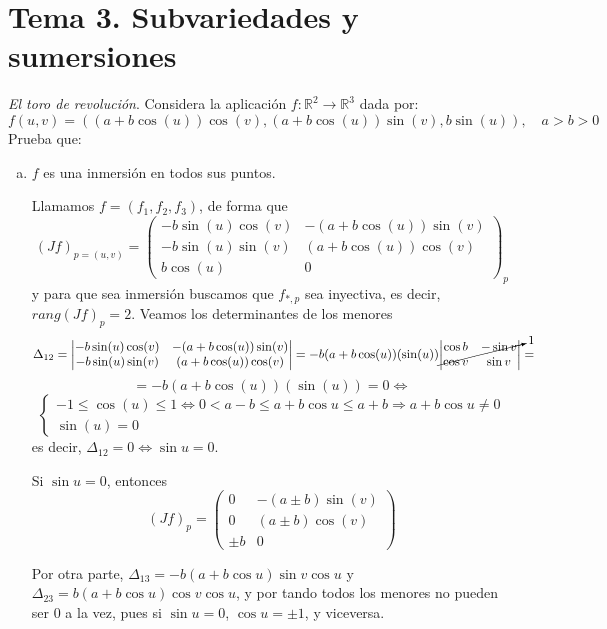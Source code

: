 \section{Tema 3. Subvariedades y sumersiones}
\begin{ejer}
    [3.7] \textit{El toro de revoluci\'on}. Considera la aplicaci\'on $f : \mathbb R^2 \to \mathbb R^3$ dada por: 
    $$f(u, v) = ((a + b  \cos  (u))  \cos (v), (a + b  \cos (u)) \sin(v), b\sin (u) ), \quad a > b > 0$$
Prueba que:
\begin{enumerate}[a)]
    \item $f$ es una inmersi\'on en todos sus puntos. 
    \begin{sol}
        Llamamos $f=(f_1,f_2,f_3)$, de forma que 
        $$(Jf)_{p=(u,v)} = \begin{pmatrix}
            -b\sin(u) \cos (v) &  -(a+b \cos (u))\sin(v) \\ -b \sin(u) \sin(v) & (a+b \cos (u)) \cos (v)\\ b  \cos (u) & 0
        \end{pmatrix}_p$$
        y para que sea inmersi\'on buscamos que $f_{*,p}$ sea inyectiva, es decir, $rang(Jf)_p =2$. Veamos los determinantes de los menores
        $$\Delta_{12} = \begin{vmatrix}
             -b\sin(u) \cos (v) &  -(a+b \cos (u))\sin(v) \\ -b \sin(u) \sin(v) & (a+b \cos (u)) \cos (v)
        \end{vmatrix}=-b(a+b \cos (u))(\sin(u))\cancelto{1}{\begin{vmatrix}
             \cos  b & -\sin v \\  \cos  v &\sin v  
        \end{vmatrix} } = $$
        $$= -b(a+b \cos (u))(\sin(u)) = 0 \iff $$
        $$\begin{cases}
            -1 \leq  \cos (u) \leq 1 \iff 0 < a-b \leq a+b \cos  u \leq a+b \Rightarrow a+b \cos  u \neq 0 \\ \sin(u)=0 
        \end{cases}$$
        es decir, $\Delta_{12} = 0\iff\sin u =0$. 

        Si $\sin u =0$, entonces 
        $$(Jf)_p = \begin{pmatrix}
            0 &  -(a\pm b)\sin(v) \\ 0 & (a\pm b)  \cos (v)\\ \pm b & 0
        \end{pmatrix}$$

        Por otra parte, $\Delta_{13} = -b(a+b \cos  u)\sin v  \cos  u$ y $\Delta_{23}=b (a+b \cos  u) \cos  v  \cos  u$, y por tando todos los menores no pueden ser 0 a la vez, pues si $\sin u =0$, $ \cos  u =\pm 1$, y viceversa. 


\end{sol}
\end{enumerate}
\end{ejer}
